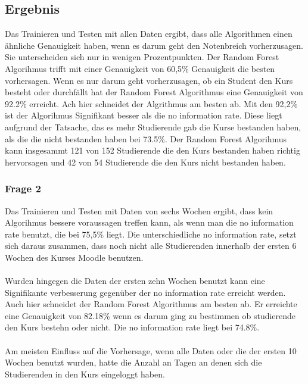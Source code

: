 \subsection{Ergebnis}
Das Trainieren und Testen mit allen Daten ergibt, dass alle Algorithmen einen ähnliche Genauigkeit haben, wenn es darum geht den Notenbreich vorherzusagen.
Sie unterscheiden sich nur in wenigen Prozentpunkten. Der Random Forest Algorihmus trifft mit einer Genauigkeit von 60,5\% Genauigkeit die besten vorhersagen.
Wenn es nur darum geht vorherzusagen, ob ein Student den Kurs besteht oder durchfällt hat der Random Forest Algorithmus eine Genauigkeit von 92.2\% erreicht. 
Ach hier schneidet der Algrithmus am besten ab. Mit den 92,2\% ist der Algorihmus Signifikant besser als die \glqq no information rate\grqq{}. 
Diese liegt aufgrund der Tatsache, das es mehr Studierende gab die Kurse bestanden haben, als die die nicht bestanden haben bei 73.5\%. 
Der Random Forest Algorihmus kann insgesammt 121 von 152 Studierende die den Kurs bestanden haben richtig hervorsagen und 42 von 54 Studierende die den Kurs nicht bestanden haben. \cite[S. 9f]{Quinn.2020}

\subsubsection{Frage 2}
Das Trainieren und Testen mit Daten von sechs Wochen ergibt, dass kein Algorihmus bessere voraussagen treffen kann, als wenn man die \glqq no information rate\grqq{} benutzt,
die bei 75,5\% liegt. Die unterschiedliche \glqq no information rate\grqq{}, setzt sich daraus zusammen, dass noch nicht alle Studierenden innerhalb der ersten 6 Wochen des Kurses Moodle benutzen. \cite[S. 10f]{Quinn.2020}
\\ \noindent \\ \noindent
Wurden hingegen die Daten der ersten zehn Wochen benutzt kann eine Signifikante verbesserung gegenüber der \glqq no information rate\grqq{} erreicht werden. 
Auch hier schneidet der Random Forest Algorithmus am besten ab. Er erreichte eine Genauigkeit von 82.18\% wenn es darum ging zu bestimmen ob studierende den Kurs bestehn oder nicht. \cite[S. 10f]{Quinn.2020}
Die \glqq no information rate\grqq{} liegt bei 74.8\%.
\\ \noindent \newline \noindent
\\ \noindent \newline \noindent
Am meisten Einfluss auf die Vorhersage, wenn alle Daten oder die der ersten 10 Wochen benutzt wurden, hatte die Anzahl an Tagen an denen sich die Studierenden in den Kurs eingeloggt haben. \cite[S. 15]{Quinn.2020}

